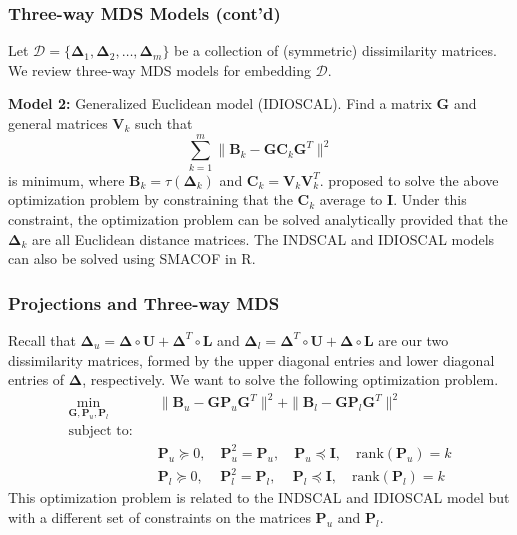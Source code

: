 \documentclass[professionalfonts,hyperref={pdfpagelabels=false,colorlinks=true,linkcolor=blue}]{beamer}
\begin{document}
\begin{frame}
  \frametitle{Three-way MDS Models (cont'd)} Let $\mathscr{D} =
  \{\bm{\Delta}_{1}, \bm{\Delta}_{2}, \dots, \bm{\Delta}_{m}\}$ be a
  collection of (symmetric) dissimilarity matrices. We review
  three-way MDS models for embedding $\mathscr{D}$.

  
  \vskip10pt{\bf Model 2:} Generalized Euclidean model (IDIOSCAL). Find a matrix
  $\mathbf{G}$ and general matrices $\mathbf{V}_k$ such that 
  \begin{equation*}
    \sum_{k=1}^{m}{\|\mathbf{B}_k -
      \mathbf{G}\mathbf{C}_k\mathbf{G}^{T}\|^{2}}
  \end{equation*}
  is minimum, where $\mathbf{B}_k = \tau(\bm{\Delta}_{k})$ and
  $\mathbf{C}_k = \mathbf{V}_{k} \mathbf{V}_k^{T}$. 
  \vskip10pt \cite{schonemann72} proposed to solve the above
  optimization problem by constraining that the $\mathbf{C}_k$ average
  to $\mathbf{I}$. Under this constraint, the optimization problem can
  be solved analytically provided that the $\bm{\Delta}_k$ are all
  Euclidean distance matrices. The INDSCAL and IDIOSCAL models
  can also be solved using SMACOF \cite{leeuw09:_multid}
  in R. 
\end{frame}
\begin{frame}
  \frametitle{Projections and Three-way MDS}
  Recall that $\bm{\Delta}_u = \bm{\Delta} \circ \mathbf{U} + \bm{\Delta}^{T}
  \circ \mathbf{L}$ and $\bm{\Delta}_l = \bm{\Delta}^{T} \circ \mathbf{U} + \bm{\Delta} \circ
  \mathbf{L}$ are our two dissimilarity matrices, formed by the upper
  diagonal entries and lower diagonal entries of $\bm{\Delta}$,
  respectively. 
  \vskip10pt We want to solve the following optimization problem.
  \begin{align*}
    \min_{\mathbf{G},\mathbf{P}_u,\mathbf{P}_l} & \quad \| \mathbf{B}_u -
    \mathbf{G}\mathbf{P}_u \mathbf{G}^{T} \|^2 + \| \mathbf{B}_{l} -
    \mathbf{G}\mathbf{P}_l \mathbf{G}^{T} \|^2 \\
    \text{subject to:} & \\
    & \quad \mathbf{P}_u \succeq 0, \quad \mathbf{P}_{u}^2 = \mathbf{P}_u,
    \quad \mathbf{P}_u \preceq \mathbf{I}, \quad
    \mathrm{rank}(\mathbf{P}_u) = k \tag{*} \\
    & \quad \mathbf{P}_l \succeq 0, \, \quad \mathbf{P}_{l}^2 = \mathbf{P}_l,
    \, \quad \mathbf{P}_l \preceq \mathbf{I}, \quad \mathrm{rank}(\mathbf{P}_l) = k\tag{**}
  \end{align*}
  This optimization problem is related to the INDSCAL and IDIOSCAL model but with
  a different set of constraints on the matrices $\mathbf{P}_u$ and $\mathbf{P}_l$.
\end{frame}
\end{document}
